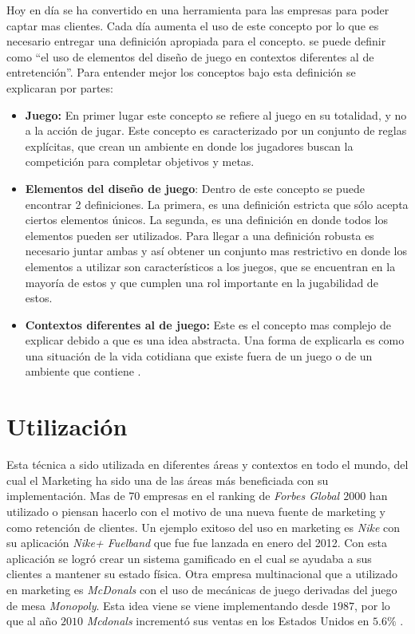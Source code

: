 Hoy en día {\GAM} se ha convertido en una herramienta para las empresas
para poder captar mas clientes.
Cada día aumenta el uso de este concepto por lo que es necesario entregar una
definición apropiada para el concepto.
{\GAM} se puede definir como ``el uso de elementos del diseño de juego en contextos
diferentes al de entretención''.
Para entender mejor los conceptos bajo esta definición se explicaran por partes:

\begin{itemize}
    \item {\bf Juego:}
        En primer lugar este concepto se refiere al juego en su totalidad,
        y no a la acción de jugar.
        Este concepto es caracterizado por un conjunto de reglas explícitas,
        que crean un ambiente en donde los jugadores buscan la competición para
        completar objetivos y metas.

    \item {\bf Elementos del diseño de juego}:
        Dentro de este concepto se puede encontrar 2 definiciones.
        La primera, es una definición estricta que sólo acepta ciertos elementos
        únicos.
        La segunda, es una definición en donde todos los elementos pueden ser
        utilizados.
        Para llegar a una definición robusta es necesario juntar ambas y así
        obtener un conjunto mas restrictivo en donde los elementos a utilizar
        son característicos a los juegos, que se encuentran en la mayoría de estos
        y que cumplen una rol importante en la jugabilidad de estos.

    \item {\bf Contextos diferentes al de juego:}
        Este es el concepto mas complejo de explicar debido a que es una idea
        abstracta.
        Una forma de explicarla es como una situación de la vida cotidiana
        que existe fuera de un juego o de un ambiente que contiene {\GAM}.

\end{itemize}

\section{Utilización}

Esta técnica a sido utilizada en diferentes áreas y contextos en todo el mundo,
del cual el Marketing ha sido una de las áreas más beneficiada con su
implementación.
Mas de 70 empresas en el ranking de \emph{Forbes Global $2000$} han utilizado o
piensan hacerlo con el motivo de una nueva fuente de marketing y como retención
de clientes\cite{Gam:Util:1}.
Un ejemplo exitoso del uso en marketing es \emph{Nike} con su aplicación
\emph{Nike+ Fuelband} que fue fue lanzada en enero del 2012\cite{Gam:Util:2}.
Con esta aplicación se logró crear un sistema gamificado en el cual se ayudaba
a sus clientes a mantener su estado física.
Otra empresa multinacional que a utilizado {\GAM} en marketing es \emph{McDonals}
con el uso de mecánicas de juego derivadas del juego de mesa \emph{Monopoly}.
Esta idea viene se viene implementando desde $1987$, por lo que al año $2010$
\emph{Mcdonals} incrementó sus ventas en los Estados Unidos en $5.6\%$
\cite{Gam:Util:2}.

